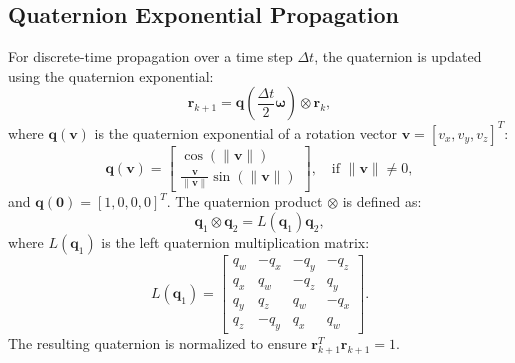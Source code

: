 \documentclass[a4paper,10pt]{article}
\begin{document}
\subsection{Quaternion Exponential Propagation}
For discrete-time propagation over a time step $\Delta t$, the quaternion is updated using the quaternion exponential:
\[
\mathbf{r}_{k+1} = \mathbf{q}\left( \frac{\Delta t}{2} \boldsymbol{\omega} \right) \otimes \mathbf{r}_k,
\]
where $\mathbf{q}(\mathbf{v})$ is the quaternion exponential of a rotation vector $\mathbf{v} = [v_x, v_y, v_z]^T$:
\[
\mathbf{q}(\mathbf{v}) = \begin{bmatrix} \cos(\|\mathbf{v}\|) \\ \frac{\mathbf{v}}{\|\mathbf{v}\|} \sin(\|\mathbf{v}\|) \end{bmatrix}, \quad \text{if } \|\mathbf{v}\| \neq 0,
\]
and $\mathbf{q}(\mathbf{0}) = [1, 0, 0, 0]^T$. The quaternion product $\otimes$ is defined as:
\[
\mathbf{q}_1 \otimes \mathbf{q}_2 = L(\mathbf{q}_1) \mathbf{q}_2,
\]
where $L(\mathbf{q}_1)$ is the left quaternion multiplication matrix:
\[
L(\mathbf{q}_1) = \begin{bmatrix}
q_w & -q_x & -q_y & -q_z \\
q_x & q_w & -q_z & q_y \\
q_y & q_z & q_w & -q_x \\
q_z & -q_y & q_x & q_w
\end{bmatrix}.
\]
The resulting quaternion is normalized to ensure $\mathbf{r}_{k+1}^T \mathbf{r}_{k+1} = 1$.
\end{document}
